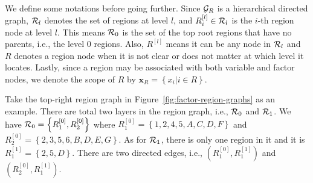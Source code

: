 We define some notations before going further. Since $\mathcal{G}_R$ is a hierarchical directed graph, $\mathcal{R}_l$ denotes the set of regions at level $l$, and
$R^{[l]}_i\in \mathcal{R}_l$ is the $i$-th region node at level $l$. This means $\mathcal{R}_0$ is the set of the top root regions that have no parents, i.e., the level $0$ regions. Also, $R^{[l]}$ means it can be any node in $\mathcal{R}_l$ and $R$ denotes a region node when it is not clear or does not matter at which level it locates. Lastly, since a region may be associated with both variable and factor nodes, we denote the scope of $R$ by  $\bm{x}_R = \left\{ x_i| i \in R \right\}$.

\begin{example}
  Take the top-right region graph in Figure~\ref{fig:factor-region-graphs} as an example. There are total two layers in the region graph, i.e., $\mathcal{R}_0$ and $\mathcal{R}_1$. We have $\mathcal{R}_0 = \left\{ R_1^{[0]}, R_2^{[0]} \right\}$ where $R_1^{[0]} = \left\{ 1, 2, 4, 5, A, C, D, F \right\}$ and $R_2^{[0]} = \left\{ 2, 3, 5, 6, B, D, E, G \right\}$. As for $\mathcal{R}_1$, there is only one region in it and it is $R_1^{[1]} = \left\{ 2, 5, D \right\}$. There are two directed edges, i.e., $\left( R_1^{[0]}, R_1^{[1]} \right)$ and $\left( R_2^{[0]}, R_1^{[1]} \right)$.
\end{example}


